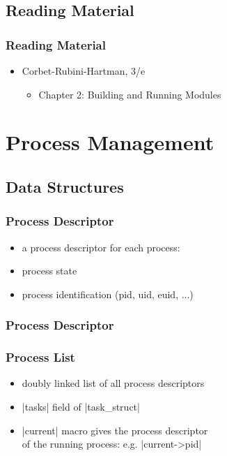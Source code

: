 \documentclass[dvipsnames]{beamer}
\begin{document}
\subsection*{Reading Material}

\begin{frame}
  \frametitle{Reading Material}

  \begin{itemize}
    \item Corbet-Rubini-Hartman, 3/e
    \begin{itemize}
      \item Chapter 2: \alert{Building and Running Modules}
    \end{itemize}
  \end{itemize}
\end{frame}

\section{Process Management}

\subsection{Data Structures}

\begin{frame}
  \frametitle{Process Descriptor}

  \begin{itemize}
    \item a process descriptor for each process:\\

    \medskip
    \item process state
    \item process identification (pid, uid, euid, ...)
   \end{itemize}
\end{frame}

\begin{frame}
  \frametitle{Process Descriptor}

  \begin{center}
  \end{center}
\end{frame}

\begin{frame}
  \frametitle{Process List}

  \begin{itemize}
    \item doubly linked list of all process descriptors
    \item {}|tasks| field of |task_struct|
    \item {}|current| macro gives the process descriptor\\
      of the running process: e.g. |current->pid|
  \end{itemize}
\end{frame}
\end{document}
